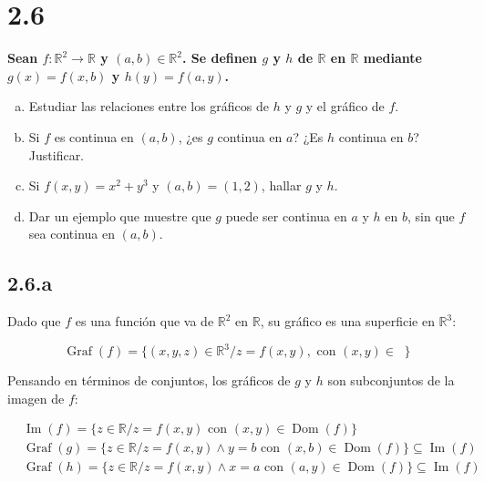 \documentclass{article}
\renewcommand{\Bbb}{\mathbb}
\begin{document}
\section*{2.6}
\label{sec:2.6}

\textbf{Sean $f: \Bbb R^2 \rightarrow \Bbb R$ y $(a, b) \in \Bbb R^2$. Se definen $g$ y $h$ de $\Bbb R$ en $\Bbb R$ mediante $g(x) = f(x,b)$ y $h(y) = f(a,y)$.}

\begin{enumerate}[(a)]
\bfseries

\item Estudiar las relaciones entre los gráficos de $h$ y $g$ y el gráfico de $f$.

\item Si $f$ es continua en $(a,b)$, ¿es $g$ continua en $a$? ¿Es $h$ continua en $b$? Justificar.

\item Si $f(x,y) = x^2 + y^3$ y $(a,b) = (1,2)$, hallar $g$ y $h$.

\item Dar un ejemplo que muestre que $g$ puede ser continua en $a$ y $h$ en $b$, sin que $f$ sea continua en $(a,b)$. 

\end{enumerate}

\subsection*{2.6.a}
\label{subsec:2.6.a}

Dado que $f$ es una función que va de $\Bbb R^2$ en $\Bbb R$, su gráfico es una superficie en $\Bbb R^3$:

\begin{equation}
\mathop{Graf}(f) = \{ (x,y,z) \in \Bbb R^3 / z = f(x,y), \text{ con } (x,y) \in \mathop{\Bbb R^2} \}
\end{equation}

Pensando en términos de conjuntos, los gráficos de $g$ y $h$ son subconjuntos de la imagen de $f$:

\begin{subequations}
\begin{align}
& \mathop{Im}(f) = \{ z \in \Bbb R / z = f(x,y) \text{ con } (x,y) \in \mathop{Dom}(f) \} \\
& \mathop{Graf}(g) = \{ z \in \Bbb R / z = f(x,y) \wedge y = b \text{ con } (x,b) \in \mathop{Dom}(f) \} \subseteq \mathop{Im}(f) \\
& \mathop{Graf}(h) = \{ z \in \Bbb R / z = f(x,y) \wedge x = a \text{ con } (a,y) \in \mathop{Dom}(f) \} \subseteq \mathop{Im}(f)
\end{align}
\end{subequations}
\end{document}
